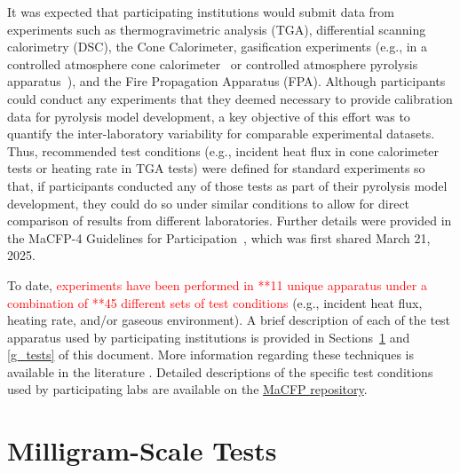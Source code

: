 \documentclass{book}
\begin{document}
It was expected that participating institutions would submit data from experiments such as thermogravimetric analysis (TGA), differential scanning calorimetry (DSC), the Cone Calorimeter, gasification experiments (e.g., in a controlled atmosphere cone calorimeter~\cite{babrauskas1992cone} or controlled atmosphere pyrolysis apparatus~\cite{swann2017controlled}), and the Fire Propagation Apparatus (FPA). Although participants could conduct any experiments that they deemed necessary to  provide calibration data for pyrolysis model development, a key objective of this effort was to quantify the inter-laboratory variability for comparable experimental datasets. Thus, recommended test conditions (e.g., incident heat flux in cone calorimeter tests or heating rate in TGA tests) were defined for standard experiments so that, if participants conducted any of those tests as part of their pyrolysis model development, they could do so under similar conditions to allow for direct comparison of results from different laboratories. Further details were provided in the MaCFP-4 Guidelines for Participation~\cite{MaCFP4Guidelines}, which was first shared March 21, 2025.

To date, \textcolor{red}{experiments have been performed in **11 unique apparatus under a combination of **45 different sets of test conditions} (e.g., incident heat flux, heating rate, and/or gaseous environment). A brief description of each of the test apparatus used by participating institutions is provided in Sections~\ref{mg_tests} and \ref{g_tests} of this document. More information regarding these techniques is available in the literature \cite{brown2001introduction,SFPEHandbookThermalDecomp}. Detailed descriptions of the specific test conditions used by participating labs are available on the \href{https://github.com/MaCFP/matl-db/tree/master/Wood/Calibration_Data}{MaCFP repository}.

\section{Milligram-Scale Tests}
\label{mg_tests}
\end{document}
